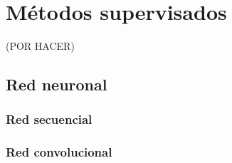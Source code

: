 \newpage
\section{Métodos supervisados}
(POR HACER)

\cite{pytorch}
\subsection{Red neuronal}

\subsubsection*{Red secuencial}

\subsubsection*{Red convolucional}